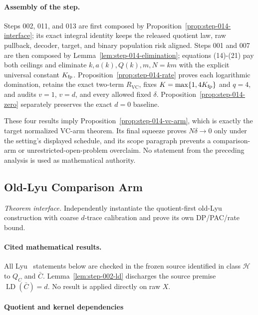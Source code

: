 \paragraph{Assembly of the step.}


 Steps 002, 011, and 013 are first composed by
Proposition~\ref{prop:step-014-interface}; its exact integral identity keeps
the released quotient law, raw pullback, decoder, target, and binary
population risk aligned.  Steps 001 and 007 are then composed by
Lemma~\ref{lem:step-014-elimination}; equations (14)-(21) pay both ceilings
and eliminate \(k,a(k),Q(k),m,N=km\) with the explicit universal constant
\(K_{\rm fp}\). Proposition~\ref{prop:step-014-rate} proves each logarithmic
domination, retains the exact two-term \(R_{\mathrm{VC}}\), fixes
\(K=\max\{1,4K_{\rm fp}\}\) and \(q=4\), and audits \(v=1\), \(v=d\), and
every allowed fixed \(\delta\). Proposition~\ref{prop:step-014-zero}
separately preserves the exact \(d=0\) baseline.

These four results imply
Proposition~\ref{prop:step-014-vc-arm}, which is exactly the target
normalized VC-arm theorem. Its final squeeze proves \(N\delta\to0\) only
under the setting's displayed schedule, and its scope paragraph prevents a
comparison-arm or unrestricted-open-problem overclaim. No statement from
the preceding analysis is used as mathematical authority.



\subsection{Old-Lyu Comparison Arm}\label{app:step_015}

\noindent\textit{Theorem interface.} Independently instantiate the quotient-first old-Lyu~\citep{lyu2025}   construction with coarse \(d\)-trace calibration and prove its own   DP/PAC/rate bound.

\paragraph{Cited mathematical results.}


All Lyu~\citep{lyu2025} statements below are checked in the frozen source identified in
class \(\mathcal H\) to \(Q_C\) and \(\bar C\). Lemma~\ref{lem:step-002-ld} discharges the source premise
\(\operatorname{LD}(\bar C)=d\). No result is applied directly on raw
\(X\).

\paragraph{Quotient and kernel dependencies}


